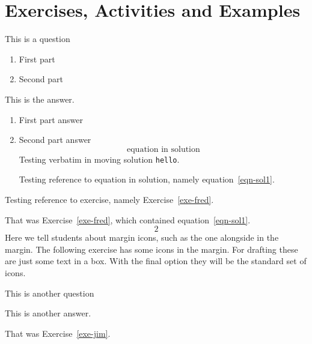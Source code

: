 \documentclass[solutionsatend]{ouunit}
\begin{document}
\section{Exercises, Activities and Examples}
\lipsum[134]
\begin{exercise}
\label{exe-fred}
This is a question
\begin{enumerate}
\item First part
\item Second part
\end{enumerate}
\begin{solution}
This is the answer.
\begin{enumerate}
\item First part answer
\item Second part answer
\begin{equation}
\text{equation in solution} \label{eqn-sol1}
\end{equation}
Testing verbatim in moving solution \verb"hello".

Testing reference to equation in solution, namely equation~\ref{eqn-sol1}.

\end{enumerate}
\end{solution}
\noendrule
\end{exercise}
Testing reference to exercise, namely Exercise~\ref{exe-fred}.

\begin{exercise}
\lipsum[133]
\begin{solution}
\lipsum[133]
\end{solution}
\noendrule
\end{exercise}
\begin{exercise}
\lipsum[133]
\begin{solution}
\lipsum[133]
\end{solution}
\end{exercise}
That was Exercise~\ref{exe-fred}, which contained equation~\ref{eqn-sol1}.
\begin{equation}
2
\end{equation}
Here we tell students about margin icons, such as the one alongside in the margin. The following exercise has some icons in the margin. For drafting these are just some text in a box. With the final option they will be the standard set of icons.

\begin{exercise}\label{exe-jim}
This is another question
\begin{solution}
This is another answer.
\end{solution}
\end{exercise}
That was Exercise~\ref{exe-jim}. 
\end{document}
